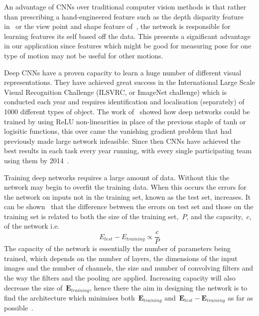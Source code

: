 \documentclass[11pt]{article} %
\begin{document}
An advantage of CNNs over traditional computer vision methods is that rather than prescribing a hand-engineered feature such as the depth disparity feature in~\cite{Shotton2011} or the view point and shape feature of~\cite{Chan2014}, the network is responsible for learning features its self based off the data. This presents a significant advantage in our application since features which might be good for measuring pose for one type of motion may not be useful for other motions. %

Deep CNNs have a proven capacity to learn a huge number of different visual representations. They have achieved great success in the International Large Scale Visual Recognition Challenge (ILSVRC, or ImageNet challenge) which is conducted each year and requires identification and localisation (separately) of 1000 different types of object. The work of~\cite{Krizhevsky2012} showed how deep networks could be trained by using ReLU non-linearities in place of the previous staple of tanh or logisitic functions, this over came the vanishing gradient problem that had previously made large network infeasible. Since then CNNs have achieved the best results in each task every year running, with every single participating team using them by 2014~\cite{Russakovsky}.

Training deep networks requires a large amount of data. Without this the network may begin to overfit the training data. When this occurs the errors for the network on inputs not in the training set, known as the test set, increases. It can be shown~\cite{Seung1992,Vapnik1994} that the difference between the errors on test set and those on the training set is related to both the size of the training set,~$P$, and the capacity,~$c$,  of the network i.e. 
\begin{equation}
E_{test}-E_{training} \propto \frac{c}{P}
\label{eq:errorCap}
\end{equation}
The capacity of the network is essentially the number of parameters being trained, which depends on the number of layers, the dimensions of the input images and the number of channels, the size and number of convolving filters and the way the filters and the pooling are applied. Increasing capacity will also decrease the size of~$\boldsymbol{E}_{training}$, hence there the aim in designing the network is to find the architecture which minimises both~$\boldsymbol{E}_{training}$ and~$\boldsymbol{E}_{test}-\boldsymbol{E}_{training}$ as far as possible~\cite{LeCun1998}.
\end{document}
